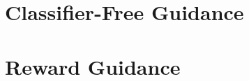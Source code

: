 \documentclass[a4paper,12pt]{article}
\begin{document}
\section*{Classifier-Free Guidance}

\section*{Reward Guidance}
\end{document}
